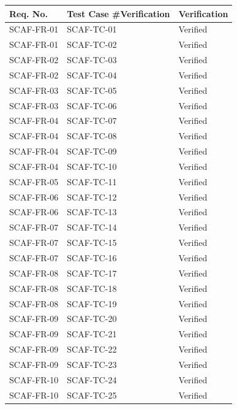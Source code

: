 \documentclass{report}
\begin{document}
\begin{tabularx}{\textwidth}{ 
  |p{}%
  |p{}%
  |p{}|%
}
  \hline
  Req. No. & Test Case \#Verification & Verification \\
  \hline
  SCAF-FR-01 & SCAF-TC-01 & Verified \\
  \hline
  SCAF-FR-01 & SCAF-TC-02 & Verified \\
  \hline
  SCAF-FR-02 & SCAF-TC-03 & Verified \\
  \hline
  SCAF-FR-02 & SCAF-TC-04 & Verified \\
  \hline
  SCAF-FR-03 & SCAF-TC-05 & Verified \\
  \hline
  SCAF-FR-03 & SCAF-TC-06 & Verified \\
  \hline
  SCAF-FR-04 & SCAF-TC-07 & Verified \\
  \hline
  SCAF-FR-04 & SCAF-TC-08 & Verified \\
  \hline
  SCAF-FR-04 & SCAF-TC-09 & Verified \\
  \hline
  SCAF-FR-04 & SCAF-TC-10 & Verified \\
  \hline
  SCAF-FR-05 & SCAF-TC-11 & Verified \\
  \hline
  SCAF-FR-06 & SCAF-TC-12 & Verified \\
  \hline
  SCAF-FR-06 & SCAF-TC-13 & Verified \\
  \hline
  SCAF-FR-07 & SCAF-TC-14 & Verified \\
  \hline
  SCAF-FR-07 & SCAF-TC-15 & Verified \\
  \hline
  SCAF-FR-07 & SCAF-TC-16 & Verified \\
  \hline
  SCAF-FR-08 & SCAF-TC-17 & Verified \\
  \hline
  SCAF-FR-08 & SCAF-TC-18 & Verified \\
  \hline
  SCAF-FR-08 & SCAF-TC-19 & Verified \\
  \hline
  SCAF-FR-09 & SCAF-TC-20 & Verified \\
  \hline
  SCAF-FR-09 & SCAF-TC-21 & Verified \\
  \hline
  SCAF-FR-09 & SCAF-TC-22 & Verified \\
  \hline
  SCAF-FR-09 & SCAF-TC-23 & Verified \\
  \hline
  SCAF-FR-10 & SCAF-TC-24 & Verified \\
  \hline
  SCAF-FR-10 & SCAF-TC-25 & Verified \\
  \hline

\end{tabularx}
\end{document}
